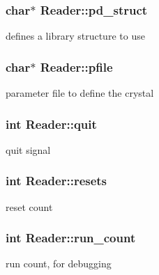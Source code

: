 \subsubsection[{pd\+\_\+struct}]{\setlength{\rightskip}{0pt plus 5cm}char$\ast$ Reader\+::pd\+\_\+struct}\label{class_reader_aa1f260272da17a496f1ecd3ce39281b9}


defines a library structure to use 

\hypertarget{class_reader_a2aa3818b76e5565fef7e72a5018ca084}{}
\subsubsection[{pfile}]{\setlength{\rightskip}{0pt plus 5cm}char$\ast$ Reader\+::pfile}\label{class_reader_a2aa3818b76e5565fef7e72a5018ca084}


parameter file to define the crystal 

\hypertarget{class_reader_ada4132c63c686a21ea6eb8f05d724edc}{}
\subsubsection[{quit}]{\setlength{\rightskip}{0pt plus 5cm}int Reader\+::quit}\label{class_reader_ada4132c63c686a21ea6eb8f05d724edc}


quit signal 

\hypertarget{class_reader_a3a38a2290db448491a46a74ca4413c71}{}
\subsubsection[{resets}]{\setlength{\rightskip}{0pt plus 5cm}int Reader\+::resets}\label{class_reader_a3a38a2290db448491a46a74ca4413c71}


reset count 

\hypertarget{class_reader_a7915928dbe39a87fe9d7ef829f848acb}{}
\subsubsection[{run\+\_\+count}]{\setlength{\rightskip}{0pt plus 5cm}int Reader\+::run\+\_\+count}\label{class_reader_a7915928dbe39a87fe9d7ef829f848acb}


run count, for debugging 

